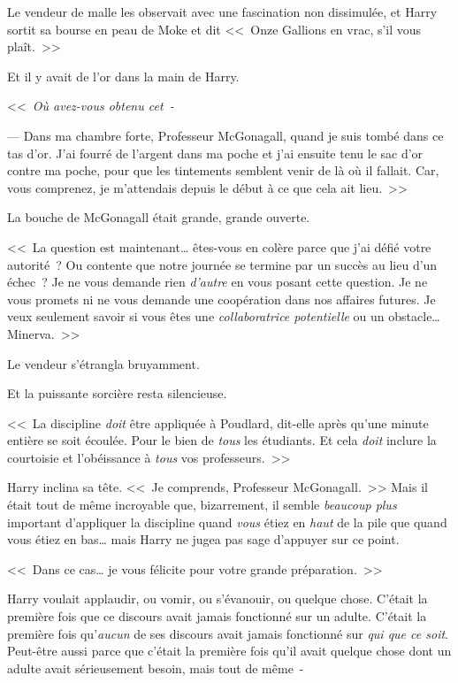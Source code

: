 Le vendeur de malle les observait avec une fascination non dissimulée, et Harry sortit sa bourse en peau de Moke et dit <<~Onze Gallions en vrac, s'il vous plaît.~>>

Et il y avait de l'or dans la main de Harry.

<<~\emph{Où avez-vous obtenu cet~-}

--- Dans ma chambre forte, Professeur McGonagall, quand je suis tombé dans ce tas d'or. J'ai fourré de l'argent dans ma poche et j'ai ensuite tenu le sac d'or contre ma poche, pour que les tintements semblent venir de là où il fallait. Car, vous comprenez, je m'attendais depuis le début à ce que cela ait lieu.~>>

La bouche de McGonagall était grande, grande ouverte.

<<~La question est maintenant… êtes-vous en colère parce que j'ai défié votre autorité~? Ou contente que notre journée se termine par un succès au lieu d'un échec~? Je ne vous demande rien \emph{d'autre} en vous posant cette question. Je ne vous promets ni ne vous demande une coopération dans nos affaires futures. Je veux seulement savoir si vous êtes une \emph{collaboratrice potentielle} ou un obstacle… Minerva.~>>

Le vendeur s'étrangla bruyamment.

Et la puissante sorcière resta silencieuse.

<<~La discipline \emph{doit} être appliquée à Poudlard, dit-elle après qu'une minute entière se soit écoulée. Pour le bien de \emph{tous} les étudiants. Et cela \emph{doit} inclure la courtoisie et l'obéissance à \emph{tous} vos professeurs.~>>

Harry inclina sa tête. <<~Je comprends, Professeur McGonagall.~>> Mais il était tout de même incroyable que, bizarrement, il semble \emph{beaucoup plus} important d'appliquer la discipline quand \emph{vous} étiez en \emph{haut} de la pile que quand vous étiez en bas… mais Harry ne jugea pas sage d'appuyer sur ce point.

<<~Dans ce cas… je vous félicite pour votre grande préparation.~>>

Harry voulait applaudir, ou vomir, ou s'évanouir, ou quelque chose. C'était la première fois que ce discours avait jamais fonctionné sur un adulte. C'était la première fois qu'\emph{aucun} de ses discours avait jamais fonctionné sur \emph{qui que ce soit}. Peut-être aussi parce que c'était la première fois qu'il avait quelque chose dont un adulte avait sérieusement besoin, mais tout de même~-


